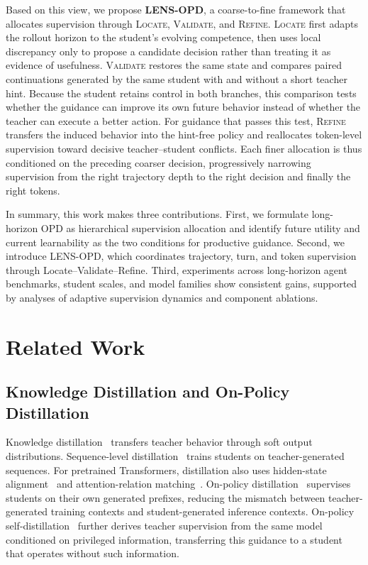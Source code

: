 \documentclass{article}
\begin{document}
Based on this view, we propose \textbf{LENS-OPD}, a coarse-to-fine framework that allocates
supervision through \textsc{Locate}, \textsc{Validate}, and \textsc{Refine}.  \textsc{Locate} first
adapts the rollout horizon to the student's evolving competence, then uses local discrepancy only to
propose a candidate decision rather than treating it as evidence of usefulness.  \textsc{Validate}
restores the same state and compares paired continuations generated by the same student with and
without a short teacher hint.  Because the student retains control in both branches, this comparison
tests whether the guidance can improve its own future behavior instead of whether the teacher can
execute a better action.  For guidance that passes this test, \textsc{Refine} transfers the induced
behavior into the hint-free policy and reallocates token-level supervision toward decisive
teacher--student conflicts.  Each finer allocation is thus conditioned on the preceding coarser
decision, progressively narrowing supervision from the right trajectory depth to the right decision
and finally the right tokens.

In summary, this work makes three contributions.  First, we formulate long-horizon OPD as
hierarchical supervision allocation and identify future utility and current learnability as the two
conditions for productive guidance.  Second, we introduce LENS-OPD, which coordinates trajectory,
turn, and token supervision through Locate--Validate--Refine.  Third, experiments across long-horizon
agent benchmarks, student scales, and model families show consistent gains, supported by analyses
of adaptive supervision dynamics and component ablations.

\section{Related Work}
\label{sec:related-work}

\subsection{Knowledge Distillation and On-Policy Distillation}

Knowledge distillation~\citep{hinton2015distilling} transfers teacher behavior
through soft output distributions. Sequence-level distillation~\citep{kim2016sequence}
trains students on teacher-generated sequences. For pretrained Transformers, distillation
also uses hidden-state alignment~\citep{sanh2019distilbert,sun2019patient,jiao2020tinybert,sun2020mobilebert}
and attention-relation matching~\citep{wang2020minilm,wang2021minilmv2}.
On-policy distillation~\citep{gu2023minillm,agarwal2024policy}
supervises students on their own generated prefixes, reducing the mismatch between teacher-generated
training contexts and student-generated inference contexts. On-policy self-distillation~\citep{zhao2026self,shenfeld2026self}
further derives teacher supervision from the same model conditioned on privileged information,
transferring this guidance to a student that operates without such information.
\end{document}
